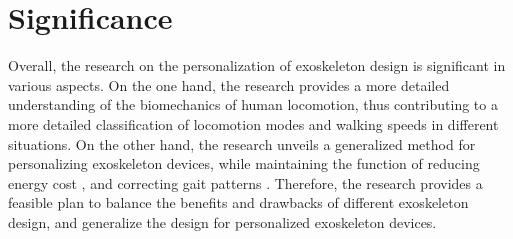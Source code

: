 \documentclass{article}
\begin{document}
\section{Significance}
\noindent Overall, the research on the personalization of exoskeleton design is significant in various aspects. On the one hand, the research provides a more detailed understanding of the biomechanics of human locomotion, thus contributing to a more detailed classification of locomotion modes and walking speeds in different situations. On the other hand, the research unveils a generalized method for personalizing exoskeleton devices, while maintaining the function of reducing energy cost \cite{ReduceEnergyCost}, and correcting gait patterns \cite{GaitCorrection}. Therefore, the research provides a feasible plan to balance the benefits and drawbacks of different exoskeleton design, and generalize the design for personalized exoskeleton devices.




\end{document}
